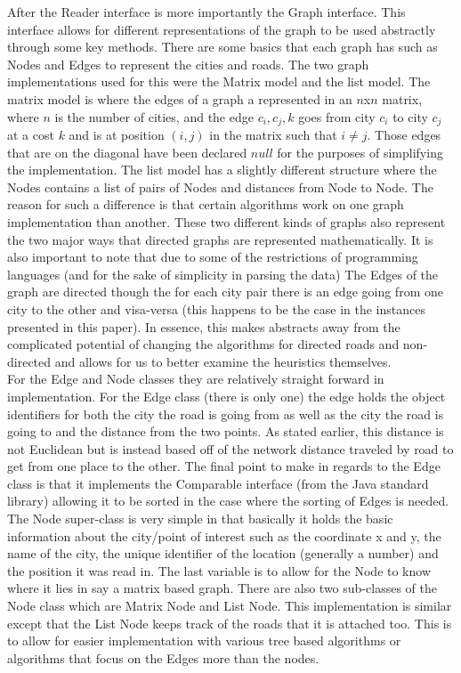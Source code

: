 \documentclass[midd]{thesis}
\newcommand{\tab}{\hspace*{2em}}
\begin{document}
\tab After the Reader  interface is more importantly the Graph interface. This interface allows for different representations of the graph to be used abstractly through some key methods. There are some basics that each graph has such as Nodes and Edges to represent the cities and roads. The two graph implementations used for this were the Matrix model and the list model. The matrix model is where the edges of a graph a represented in an $n$x$n$ matrix, where $n$ is the number of cities, and the edge $c_i,c_j,k$ goes from city $c_i$ to city $c_j$ at a cost $k$ and is at position $(i,j)$ in the matrix such that $i \neq j$. Those edges that are on the diagonal have been declared $null$ for the purposes of simplifying the implementation. The list model has a slightly different structure where the Nodes contains a list of pairs of Nodes and distances from Node to Node. The reason for such a difference is that certain algorithms work on one graph implementation than another. These two different kinds of graphs also represent the two major ways that directed graphs are represented mathematically. It is also important to note that due to some of the restrictions of programming languages (and for the sake of simplicity in parsing the data) The Edges of the graph are directed though the for each city pair there is an edge going from one city to the other and visa-versa (this happens to be the case in the instances presented in this paper). In essence, this makes abstracts away from the complicated potential of changing the algorithms for directed roads and non-directed and allows for us to better examine the heuristics themselves.\\
\tab For the Edge and Node classes they are relatively straight forward in implementation. For the Edge class (there is only one) the edge holds the object identifiers for both the city the road is going from as well as the city the road is going to and the distance from the two points. As stated earlier, this distance is not Euclidean but is instead based off of the network distance traveled by road to get from one place to the other. The final point to make in regards to the Edge class is that it implements the Comparable interface (from the Java standard library) allowing it to be sorted in the case where the sorting of Edges is needed. The Node super-class is very simple in that basically it holds the basic information about the city/point of interest such as the coordinate x and y, the name of the city, the unique identifier of the location (generally a number) and the position it was read in. The last variable is to allow for the Node to know where it lies in say a matrix based graph. There are also two sub-classes of the Node class which are Matrix Node and List Node. This implementation is similar except that the List Node keeps track of the roads that it is attached too. This is to allow for easier implementation with various tree based algorithms or algorithms that focus on the Edges more than the nodes.\\  
\end{document}

